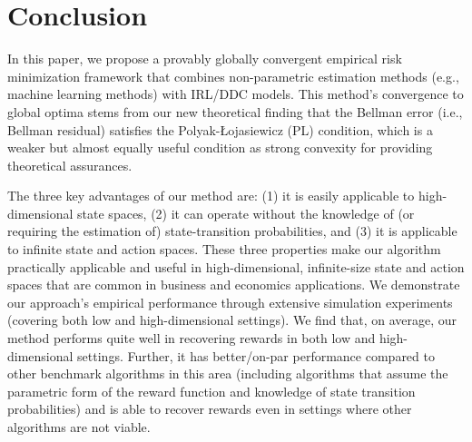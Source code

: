 \section{Conclusion}
In this paper, we propose a provably globally convergent empirical risk minimization framework that combines non-parametric estimation methods (e.g., machine learning methods) with IRL/DDC models. This method's convergence to global optima stems from our new theoretical finding that the Bellman error (i.e., Bellman residual) satisfies the Polyak-Łojasiewicz (PL) condition, which is a weaker but almost equally useful condition as strong convexity for providing theoretical assurances. 

The three key advantages of our method are: (1) it is easily applicable to high-dimensional state spaces, (2) it can operate without the knowledge of (or requiring the estimation of) state-transition probabilities, and (3) it is applicable to infinite state and action spaces. These three properties make our algorithm practically applicable and useful in high-dimensional, infinite-size state and action spaces that are common in business and economics applications. We demonstrate our approach's empirical performance through extensive simulation experiments (covering both low and high-dimensional settings). We find that, on average, our method performs quite well in recovering rewards in both low and high-dimensional settings. Further, it has better/on-par performance compared to other benchmark algorithms in this area (including algorithms that assume the parametric form of the reward function and knowledge of state transition probabilities) and is able to recover rewards even in settings where other algorithms are not viable.
